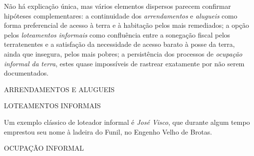 Não há explicação única, mas vários elementos dispersos parecem confirmar hipóteses complementares: a continuidade dos \textit{arrendamentos} e \textit{alugueis} como forma preferencial de acesso à terra e à habitação pelos mais remediados; a opção pelos \textit{loteamentos informais} como confluência entre a sonegação fiscal pelos terratenentes e a satisfação da necessidade de acesso barato à posse da terra, ainda que insegura, pelos mais pobres; a persistência dos processos de \textit{ocupação informal da terra}, estes quase impossíveis de rastrear exatamente por não serem documentados.

ARRENDAMENTOS E ALUGUEIS

LOTEAMENTOS INFORMAIS

Um exemplo clássico de loteador informal é \textit{José Visco}, que durante algum tempo emprestou seu nome à ladeira do Funil, no Engenho Velho de Brotas. 

OCUPAÇÃO INFORMAL